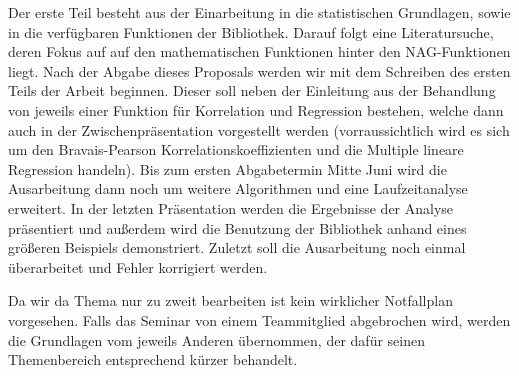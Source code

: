 \documentclass{article}
\begin{document}
Der erste Teil besteht aus der Einarbeitung in die statistischen Grundlagen, sowie in die verfügbaren Funktionen der Bibliothek.
Darauf folgt eine Literatursuche, deren Fokus auf auf den mathematischen Funktionen hinter den NAG-Funktionen liegt.
Nach der Abgabe dieses Proposals werden wir mit dem Schreiben des ersten Teils der Arbeit beginnen. 
Dieser soll neben der Einleitung aus der Behandlung von jeweils einer Funktion für Korrelation und Regression bestehen, welche dann auch in der Zwischenpräsentation vorgestellt werden (vorraussichtlich wird es sich um den Bravais-Pearson Korrelationskoeffizienten und die Multiple lineare Regression handeln).
Bis zum ersten Abgabetermin Mitte Juni wird die Ausarbeitung dann noch um weitere Algorithmen und eine Laufzeitanalyse erweitert.
In der letzten Präsentation werden die Ergebnisse der Analyse präsentiert und außerdem wird die Benutzung der Bibliothek anhand eines größeren Beispiels demonstriert.
Zuletzt soll die Ausarbeitung noch einmal überarbeitet und Fehler korrigiert werden.

Da wir da Thema nur zu zweit bearbeiten ist kein wirklicher Notfallplan vorgesehen. 
Falls das Seminar von einem Teammitglied abgebrochen wird, werden die Grundlagen vom jeweils Anderen übernommen, der dafür seinen Themenbereich entsprechend kürzer behandelt.


\end{document}
